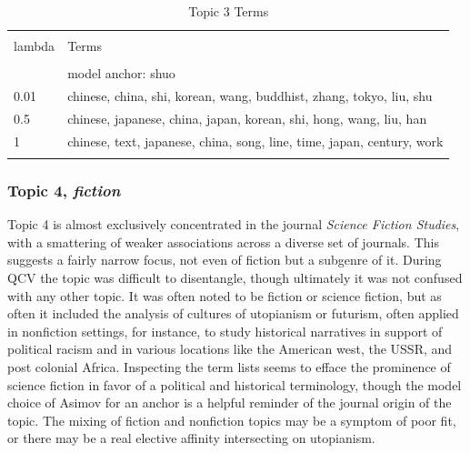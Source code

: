\documentclass[]{book}
\theoremstyle{definition}
\theoremstyle{definition}
\theoremstyle{definition}
\theoremstyle{remark}
\begin{document}
\begin{table}[!htbp] \centering 
  \caption{Topic 3 Terms} 
  \label{tab:t3d} 
\begin{tabularx}{\textwidth}{@{\extracolsep{5pt}} lY} 
\\[-1.8ex]\hline 
\hline \\[-1.8ex] 
lambda & Terms \\ 
\hline \\[-1.8ex] 
 & model anchor: shuo \\ 
0.01 & chinese, china, shi, korean, wang, buddhist, zhang, tokyo, liu, shu \\ 
0.5 & chinese, japanese, china, japan, korean, shi, hong, wang, liu, han \\ 
1 & chinese, text, japanese, china, song, line, time, japan, century, work \\ 
\hline \\[-1.8ex] 
\end{tabularx} 
\end{table}

\hypertarget{topic-4-fiction}{%
\subsubsection{\texorpdfstring{Topic 4,
\emph{fiction}}{Topic 4, fiction}}\label{topic-4-fiction}}

Topic 4 is almost exclusively concentrated in the journal \emph{Science
Fiction Studies}, with a smattering of weaker associations across a
diverse set of journals. This suggests a fairly narrow focus, not even
of fiction but a subgenre of it. During QCV the topic was difficult to
disentangle, though ultimately it was not confused with any other topic.
It was often noted to be fiction or science fiction, but as often it
included the analysis of cultures of utopianism or futurism, often
applied in nonfiction settings, for instance, to study historical
narratives in support of political racism and in various locations like
the American west, the USSR, and post colonial Africa. Inspecting the
term lists seems to efface the prominence of science fiction in favor of
a political and historical terminology, though the model choice of
Asimov for an anchor is a helpful reminder of the journal origin of the
topic. The mixing of fiction and nonfiction topics may be a symptom of
poor fit, or there may be a real elective affinity intersecting on
utopianism.
\end{document}
